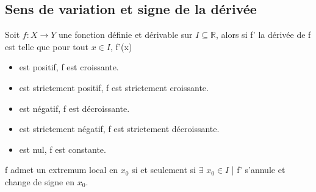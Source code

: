 \documentclass[a4paper,10pt]{book}
\newcommand{\R}{\mathbb{R}}
\begin{document}
\subsection{Sens de variation et signe de la dérivée}
Soit $f : X \longrightarrow Y$ une fonction définie et dérivable sur $I \subseteq \R$, alors si f' la dérivée de f est telle que pour tout $x \in I$, f'(x)
\begin{itemize}\renewcommand{\labelitemi}{$\bullet$}
\item est positif, f est croissante.
\item est strictement positif, f est strictement croissante.
\item est négatif, f est décroissante.
\item est strictement négatif, f est strictement décroissante.
\item est nul, f est constante.\\
\end{itemize}
f admet un extremum local en $x_{0}$ si et seulement si $\exists$ $x_{0} \in I$ | f' s'annule et change de signe en $x_{0}$.

\newpage
\end{document}
